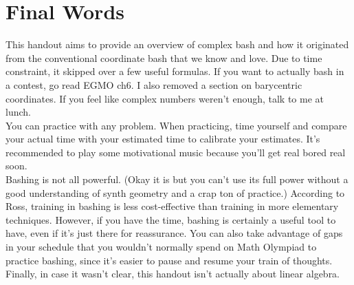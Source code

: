 \documentclass[11pt]{scrartcl}
\begin{document}
\section{Final Words}
This handout aims to provide an overview of complex bash and how it originated from the conventional coordinate bash that we know and love. Due to time constraint, it skipped over a few useful formulas. If you want to actually bash in a contest, go read EGMO ch6. I also removed a section on barycentric coordinates. If you feel like complex numbers weren't enough, talk to me at lunch.\\
You can practice with any problem. When practicing, time yourself and compare your actual time with your estimated time to calibrate your estimates. It's recommended to play some motivational music because you'll get real bored real soon.\\
Bashing is not all powerful. (Okay it is but you can't use its full power without a good understanding of synth geometry and a crap ton of practice.) According to Ross, training in bashing is less cost-effective than training in more elementary techniques. However, if you have the time, bashing is certainly a useful tool to have, even if it's just there for reassurance. You can also take advantage of gaps in your schedule that you wouldn't normally spend on Math Olympiad to practice bashing, since it's easier to pause and resume your train of thoughts.\\
Finally, in case it wasn't clear, this handout isn't actually about linear algebra. 
\end{document}
